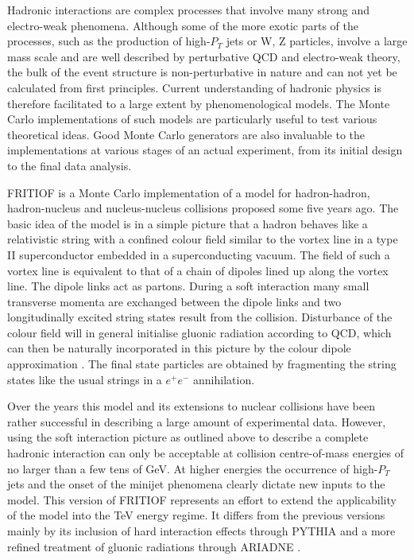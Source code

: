 Hadronic interactions are complex processes that involve many strong and
electro-weak phenomena.  Although some of the more exotic parts of the 
processes, such as 
the production of high-$P_T$ jets or W, Z particles, involve a large mass
scale and are well described by perturbative QCD and electro-weak theory, the
bulk of the event structure is non-perturbative in nature and can not yet be
calculated from first principles.  Current understanding of hadronic physics
is therefore facilitated to a large extent by phenomenological models.  The Monte Carlo
implementations of such models are particularly useful to test various 
theoretical ideas.  Good Monte Carlo generators are also invaluable to
the implementations at various stages of an actual experiment, from its initial
design to the final data analysis.

FRITIOF is a Monte Carlo implementation \cite{fr16} of a model \cite{bogn} 
\cite{bogns} for hadron-hadron, hadron-nucleus and nucleus-nucleus collisions proposed some five   years ago.  The basic idea of the model is in a simple picture that a hadron behaves like a
relativistic string with a confined colour field similar to the vortex line
in a type II superconductor embedded in a superconducting vacuum.  The field of such a vortex line is equivalent to that of a chain of dipoles lined up along the vortex line.  The dipole links act as partons.  During a soft interaction many
small transverse momenta are exchanged between the dipole links and two
longitudinally excited string states result from the collision.  Disturbance of the colour field will in general initialise gluonic radiation 
according to QCD, which can then be naturally incorporated in this picture
by the colour dipole approximation \cite{dipol}.  The final state particles are obtained by
fragmenting the string states like the usual strings \cite{lstri} in a $e^+e^-$ 
annihilation.

Over the years this model and its extensions to nuclear collisions have been
rather successful in describing a large amount of experimental data.  However,
using the soft interaction picture as outlined above to describe a complete 
hadronic interaction can only be acceptable at collision centre-of-mass energies of no larger than a few tens of GeV.  At higher energies the occurrence of high-$P_T$ jets and the onset of the minijet phenomena \cite{mjets} 
clearly dictate new inputs to the model.
This version of FRITIOF represents an effort to extend the applicability of
the model into the TeV energy regime.  It differs from the previous versions
mainly by its inclusion of hard interaction effects through PYTHIA \cite{pyth} and a more refined treatment of gluonic radiations through ARIADNE \cite{aria}.

